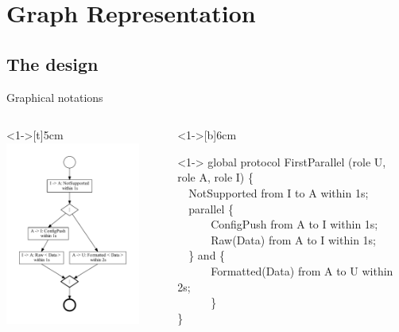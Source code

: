 \documentclass[8 pt]{beamer}
\newcommand{\BLUE}{\color[rgb]{0,0,0.69}}
\begin{document}
\section{Graph Representation}
\subsection{The design}

\begin{frame}{Graphical notations}
\begin{columns}
\begin{column}<1->[t]{5cm}
\includegraphics[height=6cm]{Parallel}
\end{column}
\begin{column}<1->[b]{6cm}
\begin{exampleblock}<1->{}
{\BLUE global protocol} FirstParallel (role U, role A, role I) \{ \\
~~NotSupported {\BLUE from} I {\BLUE to} A {\BLUE within} 1s;\\
~~parallel \{ \\
 ~~~~~~ConfigPush {\BLUE from} A {\BLUE to} I {\BLUE within} 1s;\\
 ~~~~~~Raw(Data) {\BLUE from} A {\BLUE to} I {\BLUE within} 1s;\\
~~\} and \{\\	
 ~~~~~~Formatted(Data) {\BLUE from} A {\BLUE to} U {\BLUE within} 2s;\\
~~~~~~\}\\
\}\\
\end{exampleblock}
~~\\
~~\\
~~\\
~~\\
\end{column}
\end{columns}
\end{frame}
\end{document}
